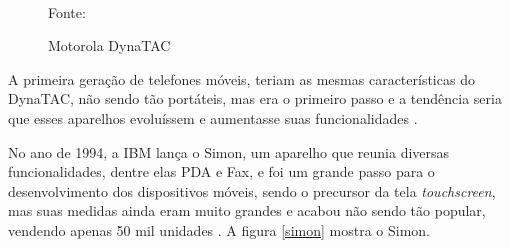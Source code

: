 \begin{figure}[!htpb]
	\centering
	\caption{Motorola DynaTAC}
	\\
	Fonte: \cite{motorola_dynatac}
	\label{motorola}
\end{figure}

A primeira geração de telefones móveis, teriam as mesmas características do DynaTAC, não sendo tão portáteis, mas era o primeiro passo e a tendência seria que esses aparelhos evoluíssem e aumentasse suas funcionalidades \cite{historia_mobile2}.

No ano de 1994, a IBM lança o Simon, um aparelho que reunia diversas funcionalidades, dentre elas \ac{PDA} e Fax, e foi um grande passo para o desenvolvimento dos dispositivos móveis, sendo o precursor da tela \textit{touchscreen}, mas suas medidas ainda eram muito grandes e acabou não sendo tão popular, vendendo apenas 50 mil unidades \cite{historia_mobile}.  A figura \autoref{simon}
mostra o Simon.

